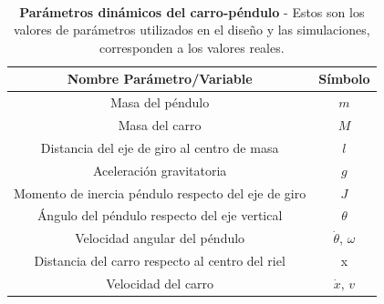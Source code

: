 \begin{table}[htdp]                             %
\centering\                                     %
\begin{tabular}{||c | c ||}                     %
\hline                                          %
\hline
Nombre Parámetro/Variable & Símbolo\\
\hline
\hline
Masa del péndulo & $m$ \\
\hline
Masa del carro & $M$\\
\hline
Distancia del eje de giro al centro de masa & $l$ \\
\hline
Aceleración gravitatoria & $g$ \\
\hline
Momento de inercia péndulo respecto del eje de giro& $J$ \\
\hline
Ángulo del péndulo respecto del eje vertical & $\theta$\\
\hline
Velocidad angular del péndulo & $\dot{\theta}$, $\omega$\\
\hline
Distancia del carro respecto al centro del riel & x\\
\hline
Velocidad del carro & $\dot{x}$, $v$\\
\hline
\hline
\end{tabular}
\caption[Tabla 1]{\textbf{Parámetros dinámicos del carro-péndulo} - Estos son los valores de parámetros utilizados en el diseño y las simulaciones, corresponden a los valores reales.}
\label{tab:tabla}                              %
\end{table}
